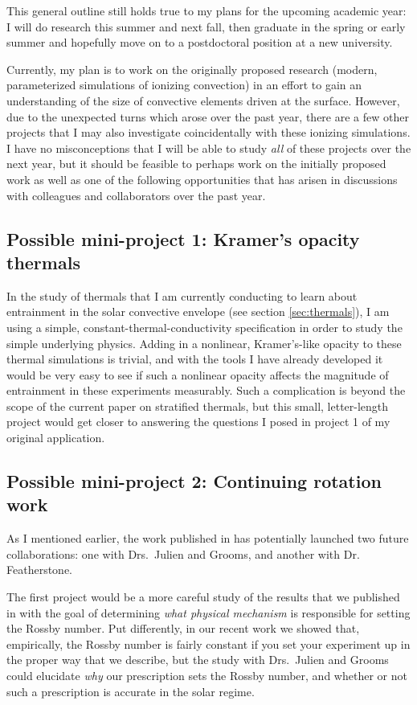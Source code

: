 \documentclass[aasms,12pt]{article}
\begin{document}
This general outline still holds true to my plans for the upcoming academic year: I will
do research this summer and next fall, then graduate in the spring or early summer and 
hopefully move on to a postdoctoral position at a new university.

Currently, my plan is to work on the originally proposed research (modern, parameterized simulations
of ionizing convection) in an effort to gain an understanding of the size of convective elements
driven at the surface. However, due to the unexpected turns which arose over the past year,
there are a few other projects that I may also investigate coincidentally with these
ionizing simulations.  I have no misconceptions that I will be able to study \emph{all} of
these projects over the next year, but it should be feasible to perhaps work on the initially
proposed work as well as one of the following opportunities that has arisen in discussions
with colleagues and collaborators over the past year.

\subsection{Possible mini-project 1: Kramer's opacity thermals}
In the study of thermals that I am currently conducting to learn about entrainment in the
solar convective envelope (see section \ref{sec:thermals}), I am using a simple,
constant-thermal-conductivity specification in order to study the simple underlying physics.
Adding in a nonlinear, Kramer's-like opacity to these thermal simulations is trivial, and
with the tools I have already developed it would be very easy to see if such a nonlinear
opacity affects the magnitude of entrainment in these experiments measurably. Such a
complication is beyond the scope of the current paper on stratified thermals, but this
small, letter-length project would get closer to answering the questions I posed in project 1
of my original application.

\subsection{Possible mini-project 2: Continuing rotation work}
\label{sec:future_rotation}
As I mentioned earlier, the work published in \citet{anders&all2019} has potentially launched
two future collaborations: one with Drs.~Julien and Grooms, and another with Dr. Featherstone.

The first project would be a more careful study of the results that we published in
\citet{anders&all2019} with the goal of determining \emph{what physical mechanism} is
responsible for setting the Rossby number. Put differently, in our recent work we showed
that, empirically, the Rossby number is fairly constant if you set your experiment up in the
proper way that we describe, but the study with Drs.~Julien and Grooms could elucidate
\emph{why} our prescription sets the Rossby number, and whether or not such a prescription
is accurate in the solar regime. 
\end{document}
